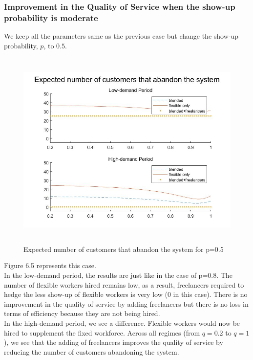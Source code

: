 \subsubsection{Improvement in the Quality of Service when the show-up probability is moderate}
We keep all the parameters same as the previous case but change the show-up probability, $p$, to $0.5$. \\
\begin{figure}[hbt!]
\includegraphics[height=10cm]{p0.5.jpg}
\caption{Expected number of customers that abandon the system for p=0.5}
\end{figure}
Figure 6.5 represents this case. \\ In the low-demand period, the results are just like in the case of p=0.8. The number of flexible workers hired remains low, as a result, freelancers required to hedge the less show-up of flexible workers is very low (0 in this case). There is no improvement in the quality of service by adding freelancers but there is no loss in terms of efficiency because they are not being hired.\\ In the high-demand period, we see a difference. Flexible workers would now be hired to supplement the fixed workforce. Across all regimes (from $q=0.2$ to $q=1$), we see that the adding of freelancers improves the quality of service by reducing the number of customers abandoning the system. 
